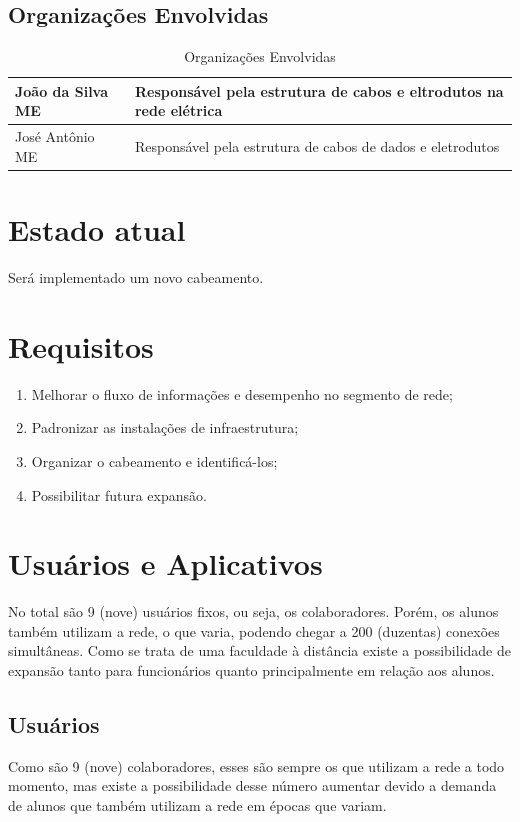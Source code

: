 \documentclass[	DIV=calc,%
							paper=a4,%
							fontsize=12pt,%
							onecolumn]{scrartcl}	 					%
\begin{document}
\subsection{Organizações Envolvidas}
\begin{table}[H]
	\centering
	\caption{Organizações Envolvidas}
	\label{my-label}
	\begin{tabular}{|l|l|}
		\hline
		João da Silva ME & Responsável pela estrutura de cabos e eltrodutos na rede elétrica \\ \hline
		José Antônio ME  & Responsável pela estrutura de cabos de dados e eletrodutos        \\ \hline
	\end{tabular}
\end{table}



\section{Estado atual}
Será implementado um novo cabeamento.

\section{Requisitos}
\begin{enumerate}
	\item Melhorar o fluxo de informações e desempenho no segmento de rede;
	\item Padronizar as instalações de infraestrutura;
	\item Organizar o cabeamento e identificá-los;
	\item Possibilitar futura expansão.	
\end{enumerate}

\section{Usuários e Aplicativos}
No total são 9 (nove) usuários fixos, ou seja, os colaboradores. Porém, os alunos também utilizam a rede, o que varia, podendo chegar a 200 (duzentas) conexões simultâneas. Como se trata de uma faculdade à distância existe a possibilidade de expansão tanto para funcionários quanto principalmente em relação aos alunos.
 

\subsection{Usuários}
Como são 9 (nove) colaboradores, esses são sempre os que utilizam a rede a todo momento, mas existe a possibilidade desse número aumentar devido a demanda de alunos que também utilizam a rede em épocas que variam.
\end{document}
